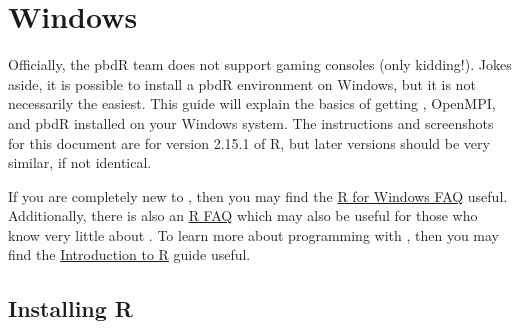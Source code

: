 \section{Windows}

Officially, the pbdR team does not support gaming consoles (only kidding!).  Jokes aside, it is possible to install a pbdR environment on Windows, but it is not necessarily the easiest.  This guide will explain the basics of getting , OpenMPI, and pbdR installed on your Windows system.  The instructions and screenshots for this document are for version 2.15.1 of R, but later versions should be very similar, if not identical.

If you are completely new to , then you may find the \href{http://cran.r-project.org/bin/windows/base/rw-FAQ.html}{R for Windows FAQ} useful.  Additionally, there is also an \href{http://cran.r-project.org/doc/FAQ/R-FAQ.html}{R FAQ} which may also be useful for those who know very little about .  To learn more about programming with , then you may find the \href{http://cran.us.r-project.org/doc/manuals/R-intro.html}{Introduction to R} guide useful.




\subsection{Installing R}


